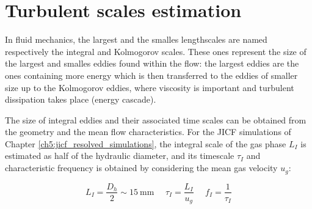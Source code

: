 \chapter{Turbulent scales estimation}
\label{app:turbulent_scales_estimation}



%
%
%	
%
%	
%
%	
%
%	
%

In fluid mechanics, the largest and the smalles lengthscales are named respectively the integral and Kolmogorov scales. These ones represent the size of the largest and smalles eddies found within the flow: the largest eddies are the ones containing more energy which is then transferred to the eddies of smaller size up to the Kolmogorov eddies, where viscosity is important and turbulent dissipation takes place (energy cascade).

The size of integral eddies and their associated time scales can be obtained from the geometry and the mean flow characteristics. For the JICF simulations of Chapter \ref{ch5:jicf_resolved_simulations}, the integral scale of the gas phase $L_I$ is estimated as half of the hydraulic diameter, and its timescale $\tau_I$ and characteristic frequency is obtained by considering the mean gas velocity $u_g$:

	\begin{equation}
	L_I = \frac{D_h}{2} \sim 15 ~ \mathrm{mm}  ~~~~~~ \tau_I = \frac{L_I}{u_g} ~~~~~~ f_I = \frac{1}{\tau_I}
	\end{equation}

